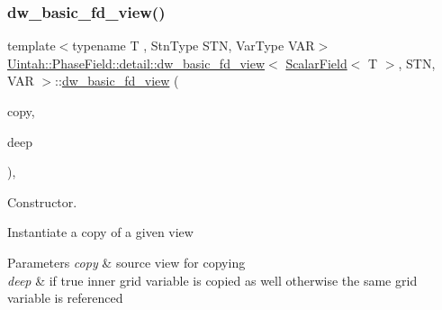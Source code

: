 \subsubsection{\texorpdfstring{dw\+\_\+basic\+\_\+fd\+\_\+view()}{dw\_basic\_fd\_view()}\hspace{0.1cm}{\footnotesize\ttfamily [1/4]}}
{\footnotesize\ttfamily template$<$typename T , Stn\+Type S\+TN, Var\+Type V\+AR$>$ \\
\hyperlink{classUintah_1_1PhaseField_1_1detail_1_1dw__basic__fd__view}{Uintah\+::\+Phase\+Field\+::detail\+::dw\+\_\+basic\+\_\+fd\+\_\+view}$<$ \hyperlink{structUintah_1_1PhaseField_1_1ScalarField}{Scalar\+Field}$<$ T $>$, S\+TN, V\+AR $>$\+::\hyperlink{classUintah_1_1PhaseField_1_1detail_1_1dw__basic__fd__view}{dw\+\_\+basic\+\_\+fd\+\_\+view} (\begin{DoxyParamCaption}\item[{const \hyperlink{classUintah_1_1PhaseField_1_1detail_1_1dw__basic__fd__view}{dw\+\_\+basic\+\_\+fd\+\_\+view}$<$ \hyperlink{structUintah_1_1PhaseField_1_1ScalarField}{Scalar\+Field}$<$ T $>$, S\+TN, V\+AR $>$ $\ast$}]{copy,  }\item[{bool}]{deep }\end{DoxyParamCaption})\hspace{0.3cm}{\ttfamily [inline]}, {\ttfamily [protected]}}



Constructor. 

Instantiate a copy of a given view


\begin{DoxyParams}{Parameters}
{\em copy} & source view for copying \\
\hline
{\em deep} & if true inner grid variable is copied as well otherwise the same grid variable is referenced \\
\hline
\end{DoxyParams}
\mbox{\label{classUintah_1_1PhaseField_1_1detail_1_1dw__basic__fd__view_3_01ScalarField_3_01T_01_4_00_01STN_00_01VAR_01_4_a23be6debd2588a1c5b9c89996ad9c314}} 
